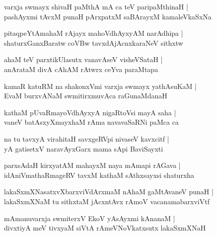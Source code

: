 \begin{shloka}
varxja swmayx shivaH paMthA mA ca teV paripaMthinaH |\\
pashAyxmi tAvxM punaH pArxpatxM saBArayxM kamaleVkaSxNa
\end{shloka}

\begin{shloka}
pitaqpeYtAmahaM rAjayx mahoVdhAyxyAM narAdhipa |\\
shaturxGanxBaratw coVBw tavxdAjAcnxkaraNeV sithxtw
\end{shloka}

\begin{shloka}
ahaM teV parxtikUlasutx vanavAseV visheVSataH |\\
anArataM divA cAhAM rAtwrx ceYva paraMtapa
\end{shloka}

\begin{shloka}
kamaR katuRM na shakonxVmi varxja swmayx yathAsuKaM |\\
EvaM burxvANaM swmitirxmuvAca raGunaMdanaH 
\end{shloka}

\begin{shloka}
kathaM pUvaRmayoVdhAyxyA nigaRtoVsi mayA saha |\\
vaneV batAsxyXmayxhaM rAma navavaSaRNi paMca ca
\end{shloka}

\begin{shloka}
na tu tavxyA virahitaH savxgeRVpi nivaseV kavxcitf |\\
yA gatisetxV naravAyxGarx mama sApi BaviSayxti
\end{shloka}

\begin{shloka}
parxsAdaH kirxyatAM mahayxM naya mAmapi rAGava |\\
idAniVmathaRmageRV tavxM kathaM sAthxsayxsi shaturxha\R
\end{shloka}

\begin{shloka}
lakaSxmXNasatxvXbarxviVdArxmaM nAhaM gaMtAvaneV punaH |\\
lakaSxmXNaM tu sithxtaM jAcxntAvx rAmoV vacanamabarxviVtf
\end{shloka}

\begin{shloka}
mAmanuvarxja swmiterxV EkoV yAsAyxmi kAnanaM |\\
divxtiyA meV tivxyaM siVtA rAmeVNoVkatxsutx lakaSxmXNaH
\end{shloka}

